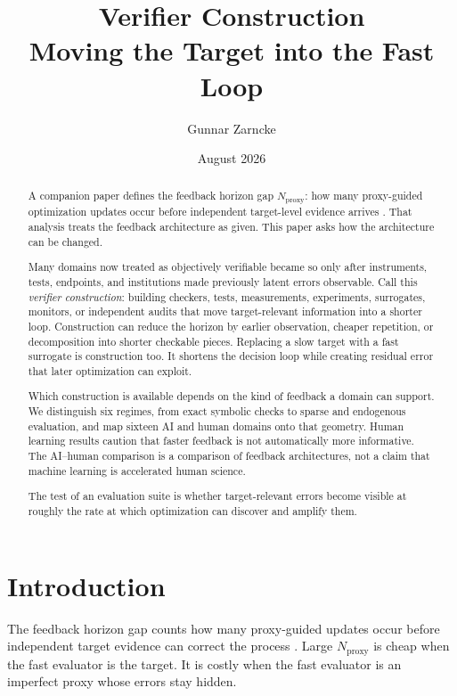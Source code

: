 \documentclass[11pt]{article}
\title{\textbf{Verifier Construction}\\
\large Moving the Target into the Fast Loop}
\author{Gunnar Zarncke}
\date{August 2026}
\newcommand{\Nproxy}{N_{\mathrm{proxy}}}
\begin{document}
\maketitle

\begin{abstract}
A companion paper defines the feedback horizon gap \(\Nproxy\): how many proxy-guided optimization updates occur before independent target-level evidence arrives \parencite{zarncke2026feedbackhorizon}. That analysis treats the feedback architecture as given. This paper asks how the architecture can be changed.

Many domains now treated as objectively verifiable became so only after instruments, tests, endpoints, and institutions made previously latent errors observable. Call this \emph{verifier construction}: building checkers, tests, measurements, experiments, surrogates, monitors, or independent audits that move target-relevant information into a shorter loop. Construction can reduce the horizon by earlier observation, cheaper repetition, or decomposition into shorter checkable pieces. Replacing a slow target with a fast surrogate is construction too. It shortens the decision loop while creating residual error that later optimization can exploit.

Which construction is available depends on the kind of feedback a domain can support. We distinguish six regimes, from exact symbolic checks to sparse and endogenous evaluation, and map sixteen AI and human domains onto that geometry. Human learning results caution that faster feedback is not automatically more informative. The AI--human comparison is a comparison of feedback architectures, not a claim that machine learning is accelerated human science.

The test of an evaluation suite is whether target-relevant errors become visible at roughly the rate at which optimization can discover and amplify them.
\end{abstract}

\section{Introduction}

The feedback horizon gap counts how many proxy-guided updates occur before independent target evidence can correct the process \parencite{zarncke2026feedbackhorizon}. Large \(\Nproxy\) is cheap when the fast evaluator is the target. It is costly when the fast evaluator is an imperfect proxy whose errors stay hidden.
\end{document}
